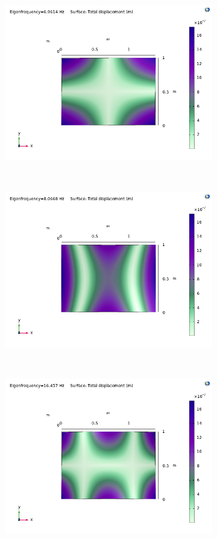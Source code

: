 \documentclass[a4paper]{article}
\begin{document}
\begin{figure}[h]
	\centering
	\begin{subfigure}[b]{0.31\linewidth}
		\includegraphics[width=0.9\linewidth]{comsol/1f.png}
	\end{subfigure}
	~
	\begin{subfigure}[b]{0.31\linewidth}
		\includegraphics[width=0.9\linewidth]{comsol/2f.png}
	\end{subfigure}
	~
	\begin{subfigure}[b]{0.31\linewidth}
		\includegraphics[width=0.9\linewidth]{comsol/3f.png}
	\end{subfigure}
	

\end{figure}
\end{document}
